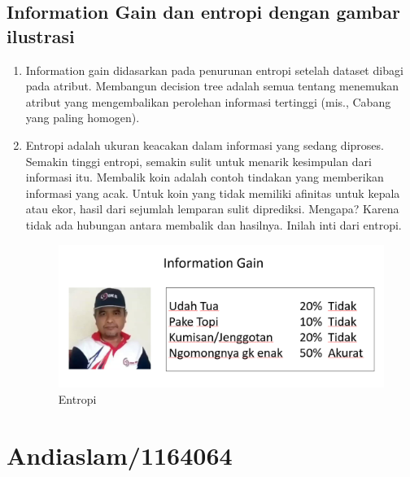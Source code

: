 \subsection{Information Gain dan entropi dengan gambar ilustrasi}
\begin{enumerate}
\item Information gain didasarkan pada penurunan entropi setelah dataset dibagi pada atribut. Membangun decision tree adalah semua tentang menemukan atribut yang mengembalikan perolehan informasi tertinggi (mis., Cabang yang paling homogen).
\item Entropi adalah ukuran keacakan dalam informasi yang sedang diproses. Semakin tinggi entropi, semakin sulit untuk menarik kesimpulan dari informasi itu. Membalik koin adalah contoh tindakan yang memberikan informasi yang acak. Untuk koin yang tidak memiliki afinitas untuk kepala atau ekor, hasil dari sejumlah lemparan sulit diprediksi. Mengapa? Karena tidak ada hubungan antara membalik dan hasilnya. Inilah inti dari entropi.
\begin{figure}[ht]
\centering
\includegraphics[scale=0.5]{figures/andi/no7.PNG}
\caption{Entropi}
\label{contoh}
\end{figure}
\end{enumerate}



\section{Andiaslam/1164064}
